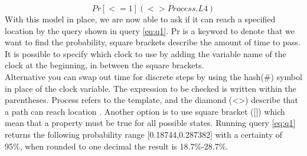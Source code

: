 \begin{equation}\label{eq:q1}
Pr[<=1](<> Process.L4)
\end{equation}
With this model in place, we are now able to ask if it can reach a specified location by the query shown in query \ref{eq:q1}.
Pr is a keyword to denote that we want to find the probability, square brackets describe the amount of time to pass. 
It is possible to specify which clock to use by adding the variable name of the clock at the beginning, in between the square brackets.\\
Alternative you can swap out time for discrete steps by using the hash(\#) symbol in place of the clock variable.
The expression to be checked is written within the parentheses.
Process refers to the template, and the diamond (<>) describe that a path can reach location .
Another option is to use square bracket ([]) which mean that a property must be true for all possible states.
Running query \ref{eq:q1} returns the following probability range [0.18744,0.287382] with a certainty of 95\%, when rounded to one decimal the result is 18.7\%-28.7\%.

